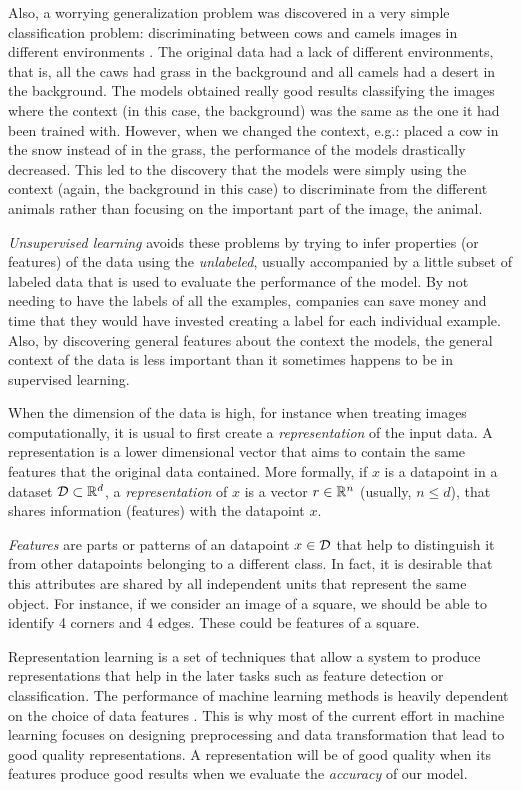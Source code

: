 Also, a worrying generalization problem was discovered in a very simple classification problem: discriminating between cows and camels images in different environments \citep{beery2018recognition}. The original data had a lack of different environments, that is, all the caws had grass in the background and all camels had a desert in the background. The models obtained really good results classifying the images where the context (in this case, the background) was the same as the one it had been trained with. However, when we changed the context, e.g.: placed a cow in the snow instead of in the grass, the performance of the models drastically decreased. This led to the discovery that the models were simply using the context (again, the background in this case) to discriminate from the different animals rather than focusing on the important part of the image, the animal.

\emph{Unsupervised learning} avoids these problems by trying to infer properties (or features) of the data using the \emph{unlabeled}, usually accompanied by a little subset of labeled data that is used to evaluate the performance of the model. By not needing to have the labels of all the examples, companies can save money and time that they would have invested creating a label for each individual example. Also, by discovering general features about the context the models, the general context of the data is less important than it sometimes happens to be in supervised learning.

When the dimension of the data is high, for instance when treating images computationally, it is usual to first create a \emph{representation} of the input data. A representation is a lower dimensional vector that aims to contain the same features that the original data contained. More formally, if $x$ is a datapoint in a dataset $\mathcal{D} \subset \mathbb{R}^d$, a \emph{representation} of $x$ is a vector $r \in \mathbb{R}^n$ (usually, $n \leq d$), that shares information (features) with the datapoint $x$. 


\emph{Features} are parts or patterns of an datapoint $x \in \mathcal{D}$ that help to distinguish it from other datapoints belonging to a different class. In fact, it is desirable that this attributes are shared by all independent units that represent the same object. For instance, if we consider an image of a square, we should be able to identify 4 corners and 4 edges. These could be features of a square.

Representation learning is a set of techniques that allow a system to produce representations that help in the later tasks such as feature detection or classification.
The performance of machine learning methods is heavily dependent on the choice of data features \citep{bengio_representation_2014}. This is why most of the current 
effort in machine learning focuses on designing preprocessing and data transformation that lead to good quality representations. A representation will be of good quality when its features
produce good results when we evaluate the \emph{accuracy} of our model.

